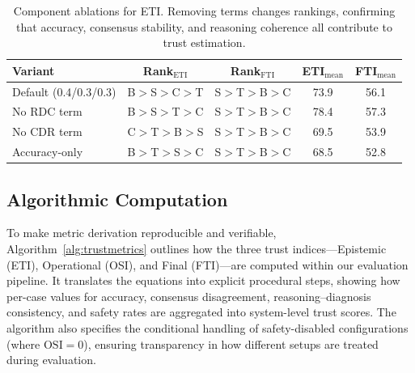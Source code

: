 \documentclass[letterpaper]{article} %
\begin{document}
\begin{table}[t]
\centering
\caption{Component ablations for ETI. Removing terms changes rankings, confirming that accuracy, consensus stability, and reasoning coherence all contribute to trust estimation.}
\label{tab:eti_component_ablate}

\begin{tabular}{lcccc}
\toprule
\textbf{Variant} & \textbf{Rank$_\text{ETI}$} & \textbf{Rank$_\text{FTI}$} & \textbf{ETI$_\text{mean}$} & \textbf{FTI$_\text{mean}$} \\
\midrule
Default (0.4/0.3/0.3) & B$>$S$>$C$>$T & S$>$T$>$B$>$C & 73.9 & 56.1 \\
No RDC term & B$>$S$>$T$>$C & S$>$T$>$B$>$C & 78.4 & 57.3 \\
No CDR term & C$>$T$>$B$>$S & S$>$T$>$B$>$C & 69.5 & 53.9 \\
Accuracy-only & B$>$T$>$S$>$C & S$>$T$>$B$>$C & 68.5 & 52.8 \\
\bottomrule
\end{tabular}
\end{table}



\subsection{Algorithmic Computation}
To make metric derivation reproducible and verifiable, Algorithm~\ref{alg:trustmetrics} outlines how the three trust indices—Epistemic (ETI), Operational (OSI), and Final (FTI)—are computed within our evaluation pipeline.  
It translates the equations into explicit procedural steps, showing how per-case values for accuracy, consensus disagreement, reasoning–diagnosis consistency, and safety rates are aggregated into system-level trust scores.  
The algorithm also specifies the conditional handling of safety-disabled configurations (where $\mathrm{OSI}=0$), ensuring transparency in how different setups are treated during evaluation.
\end{document}
